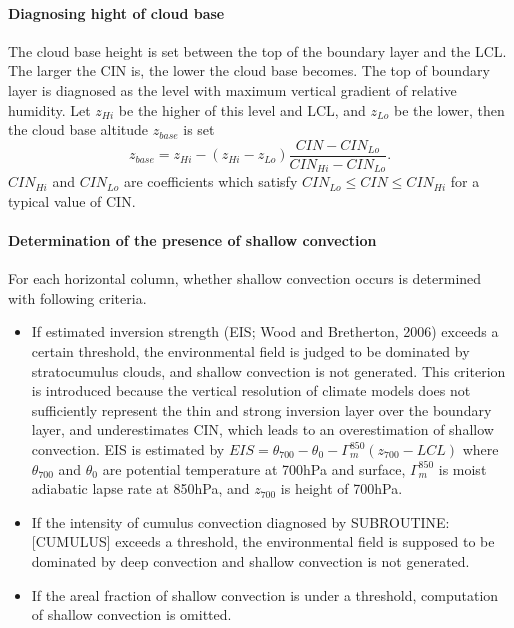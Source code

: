 \paragraph{Diagnosing hight of cloud base}\label{diagno-height-of-cloud-base}

The cloud base height is set between the top of the boundary layer and the LCL. The larger the CIN is, the lower the cloud base becomes.
The top of boundary layer is diagnosed as the level with maximum vertical gradient of relative humidity. 
Let $z_{Hi}$ be the higher of this level and LCL, and $z_{Lo}$ be the lower, then the cloud base altitude $z_{base}$ is set
\begin{equation}\label{zbase}
    z_{base} = z_{Hi} - (z_{Hi}-z_{Lo})\frac{CIN-CIN_{Lo}}{CIN_{Hi} - CIN_{Lo}}.
\end{equation}
$CIN_{Hi}$ and $CIN_{Lo}$ are coefficients which satisfy $CIN_{Lo}\le CIN \le CIN_{Hi}$ for a typical value of CIN.

\paragraph{Determination of the presence of shallow convection}\label{presence-of-shallow-convection}

For each horizontal column, whether shallow convection occurs is determined with following criteria.
\begin{itemize}
    \item If estimated inversion strength (EIS; Wood and Bretherton, 2006) exceeds a certain threshold,
    the environmental field is judged to be dominated by stratocumulus clouds, and shallow convection is not generated.
    This criterion is introduced because the vertical resolution of climate models does not sufficiently represent the thin and strong inversion layer over the boundary layer,
    and underestimates CIN, which leads to an overestimation of shallow convection.
    EIS is estimated by
     $EIS=\theta_{700}-\theta_{0}-\Gamma_m^{850}(z_{700}-LCL)$
    where $\theta_{700}$ and $\theta_0$ are potential temperature at 700hPa and surface, $\Gamma_m^{850}$ is moist adiabatic lapse rate at 850hPa, 
    and $z_{700}$ is height of 700hPa.
    \item If the intensity of cumulus convection diagnosed by SUBROUTINE:[CUMULUS] exceeds a threshold, the environmental 
    field is supposed to be dominated by deep convection and shallow convection is not generated.
    \item If the areal fraction of shallow convection is under a threshold, computation of shallow convection is omitted.
 \end{itemize}


